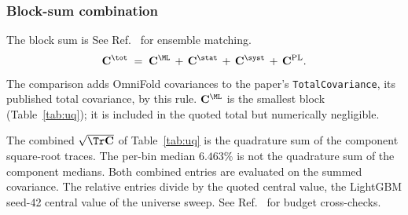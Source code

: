 \subsubsection{Block-sum combination}
\label{sec:combine}
The block sum is See Ref.~\cite{NoteRecords2026} for ensemble matching.
\begin{equation}
\mathbf{C}^{\tot}
\;=\;
\mathbf{C}^{\ML} \,+\, \mathbf{C}^{\stat} \,+\, \mathbf{C}^{\syst} \,+\, \mathbf{C}^{\mathrm{PL}}.
\label{eq:blocksum}
\end{equation}
The comparison adds OmniFold covariances to the paper's \texttt{TotalCovariance}, its published total covariance, by this rule. $\mathbf{C}^{\ML}$ is the smallest block (Table~\ref{tab:uq}); it is included in the quoted total but numerically negligible.

The combined $\sqrt{\Tr\mathbf{C}}$ of Table~\ref{tab:uq} is the quadrature sum of the component square-root traces. The per-bin median $6.463\%$ is not the quadrature sum of the component medians. Both combined entries are evaluated on the summed covariance. The relative entries divide by the quoted central value, the LightGBM seed-42 central value of the universe sweep. See Ref.~\cite{NoteRecords2026} for budget cross-checks. 

